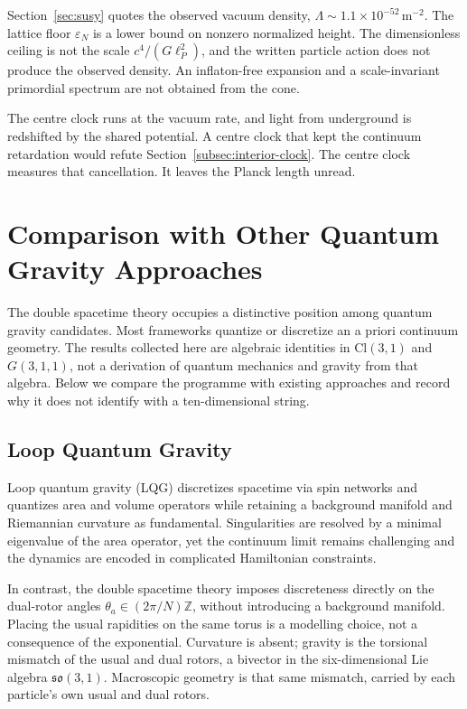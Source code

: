 \documentclass[a4paper]{article}
\begin{document}
Section~\ref{sec:susy} quotes the observed vacuum density, \(\Lambda\sim 1.1\times 10^{-52}\,\mathrm{m}^{-2}\). The lattice floor \(\varepsilon_N\) is a lower bound on nonzero normalized height. The dimensionless ceiling is not the scale \(c^4/(G\ell_P^2)\), and the written particle action does not produce the observed density. An inflaton-free expansion and a scale-invariant primordial spectrum are not obtained from the cone.

The centre clock runs at the vacuum rate, and light from underground is redshifted by the shared potential. A centre clock that kept the continuum retardation would refute Section~\ref{subsec:interior-clock}. The centre clock measures that cancellation. It leaves the Planck length unread.

\section{Comparison with Other Quantum Gravity Approaches}
\label{sec:comparison}

The double spacetime theory occupies a distinctive position among quantum gravity candidates. Most frameworks quantize or discretize an a priori continuum geometry. The results collected here are algebraic identities in $\mathrm{Cl}(3,1)$ and $G(3,1,1)$, not a derivation of quantum mechanics and gravity from that algebra. Below we compare the programme with existing approaches and record why it does not identify with a ten-dimensional string.

\subsection{Loop Quantum Gravity}

Loop quantum gravity (LQG) discretizes spacetime via spin networks and quantizes area and volume operators while retaining a background manifold and Riemannian curvature as fundamental. Singularities are resolved by a minimal eigenvalue of the area operator, yet the continuum limit remains challenging and the dynamics are encoded in complicated Hamiltonian constraints.

In contrast, the double spacetime theory imposes discreteness directly on the dual-rotor angles $\theta_a \in (2\pi/N)\mathbb{Z}$, without introducing a background manifold. Placing the usual rapidities on the same torus is a modelling choice, not a consequence of the exponential. Curvature is absent; gravity is the torsional mismatch of the usual and dual rotors, a bivector in the six-dimensional Lie algebra $\mathfrak{so}(3,1)$. Macroscopic geometry is that same mismatch, carried by each particle's own usual and dual rotors.
\end{document}

